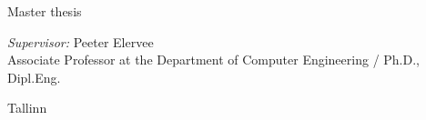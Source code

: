 \begin{titlepage}
	\vspace{2em}
	
	\begin{center}		
		\textsf{Master thesis}
	\end{center}
	
	\vspace{2cm}
	
	\begin{flushright}		
			
			\emph{Supervisor:} \quad Peeter Elervee \\
			\small{Associate Professor at the Department of Computer Engineering / Ph.D., Dipl.Eng.}		
	\end{flushright}
	
	\vspace{\fill}
	\begin{center} 
		Tallinn \the\year
	\end{center}	
\end{titlepage}
